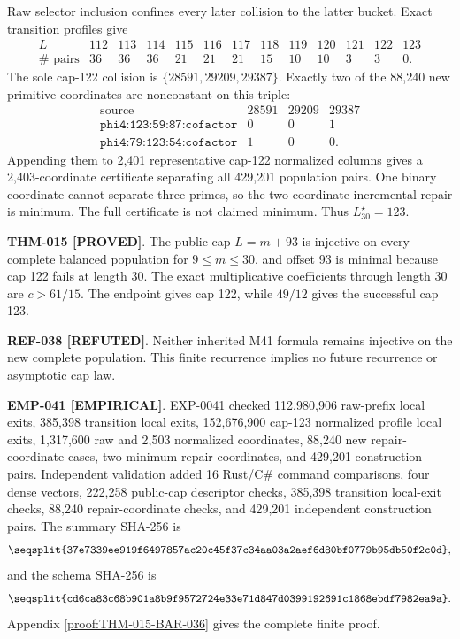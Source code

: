 \documentclass[11pt]{article}
\newcommand{\claimstatus}[2]{\textbf{#1 [#2]}}
\begin{document}
Raw selector inclusion confines every later collision to the latter bucket.
Exact transition profiles give
\[
\begin{array}{c|rrrrrrrrrrrr}
L&112&113&114&115&116&117&118&119&120&121&122&123\\
\hline
\#\text{ pairs}&36&36&36&21&21&21&15&10&10&3&3&0.
\end{array}
\]
The sole cap-122 collision is
\(\{28591,29209,29387\}\). Exactly two of the 88,240 new primitive
coordinates are nonconstant on this triple:
\[
\begin{array}{c|rrr}
\text{source}&28591&29209&29387\\
\hline
\texttt{phi4:123:59:87:cofactor}&0&0&1\\
\texttt{phi4:79:123:54:cofactor}&1&0&0.
\end{array}
\]
Appending them to 2,401 representative cap-122 normalized columns gives a
2,403-coordinate certificate separating all 429,201 population pairs.
One binary coordinate cannot separate three primes, so the two-coordinate
incremental repair is minimum. The full certificate is not claimed minimum.
Thus \(L_{30}^{\star}=123\).

\claimstatus{THM-015}{PROVED}. The public cap \(L=m+93\) is injective on
every complete balanced population for \(9\le m\le30\), and offset 93 is
minimal because cap 122 fails at length 30. The exact multiplicative
coefficients through length 30 are \(c>61/15\). The endpoint gives cap 122,
while \(49/12\) gives the successful cap 123.

\claimstatus{REF-038}{REFUTED}. Neither inherited M41 formula remains
injective on the new complete population. This finite recurrence implies no
future recurrence or asymptotic cap law.

\claimstatus{EMP-041}{EMPIRICAL}. EXP-0041 checked 112,980,906 raw-prefix
local exits, 385,398 transition local exits, 152,676,900 cap-123 normalized
profile local exits, 1,317,600 raw and 2,503 normalized coordinates, 88,240
new repair-coordinate cases, two minimum repair coordinates, and 429,201
construction pairs. Independent validation added 16 Rust/C\# command
comparisons, four dense vectors, 222,258 public-cap descriptor checks,
385,398 transition local-exit checks, 88,240 repair-coordinate checks, and
429,201 independent construction pairs. The summary SHA-256 is
\[
\texttt{\seqsplit{37e7339ee919f6497857ac20c45f37c34aa03a2aef6d80bf0779b95db50f2c0d}},
\]
and the schema SHA-256 is
\[
\texttt{\seqsplit{cd6ca83c68b901a8b9f9572724e33e71d847d0399192691c1868ebdf7982ea9a}}.
\]
Appendix \ref{proof:THM-015-BAR-036} gives the complete finite proof.
\end{document}
